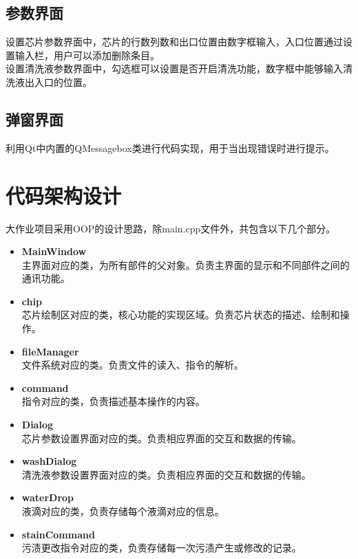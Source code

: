 \documentclass[12pt, a4paper]{article}
\begin{document}
		
	
		\subsection{参数界面}
		设置芯片参数界面中，芯片的行数列数和出口位置由数字框输入，入口位置通过设置输入栏，用户可以添加删除条目。\\ \hspace*{0.8cm}		
		设置清洗液参数界面中，勾选框可以设置是否开启清洗功能，数字框中能够输入清洗液出入口的位置。
		
	
	
		\subsection{弹窗界面}
		利用Qt中内置的QMessagebox类进行代码实现，用于当出现错误时进行提示。
		
		\section{代码架构设计}
		大作业项目采用OOP的设计思路，除main.cpp文件外，共包含以下几个部分。
		\begin{itemize}
			\item \textbf{MainWindow} \\ \hspace*{0.8cm}	主界面对应的类，为所有部件的父对象。负责主界面的显示和不同部件之间的通讯功能。
			\item \textbf{chip} \\ \hspace*{0.8cm}	芯片绘制区对应的类，核心功能的实现区域。负责芯片状态的描述、绘制和操作。
			\item \textbf{fileManager} \\ \hspace*{0.8cm}	文件系统对应的类。负责文件的读入、指令的解析。
			\item \textbf{command} \\ \hspace*{0.8cm}	指令对应的类，负责描述基本操作的内容。
			\item \textbf{Dialog} \\ \hspace*{0.8cm}	芯片参数设置界面对应的类。负责相应界面的交互和数据的传输。
			\item \textbf{\large washDialog} \\ \hspace*{0.8cm}	清洗液参数设置界面对应的类。负责相应界面的交互和数据的传输。
			\item \textbf{\large waterDrop} \\ \hspace*{0.8cm}	液滴对应的类，负责存储每个液滴对应的信息。
			\item \textbf{\large stainCommand} \\ \hspace*{0.8cm}	污渍更改指令对应的类，负责存储每一次污渍产生或修改的记录。
		\end{itemize}
		
\end{document}
